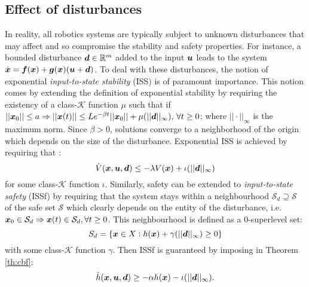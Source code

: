 \subsection{Effect of disturbances}
In reality, all robotics systems are typically subject to unknown disturbances that may affect and so compromise the stability and safety properties. For instance, a bounded disturbance $\boldsymbol{d}\in\mathbb{R}^m$ added to the input $\boldsymbol{u}$ leads to the system $\dot{\boldsymbol{x}} = \boldsymbol{f}(\boldsymbol{x})+\boldsymbol{g}(\boldsymbol{x})(\boldsymbol{u}+\boldsymbol{d})$. To deal with these disturbances, the notion of exponential \textit{input-to-state stability} (ISS) is of paramount importance. This notion comes by extending the definition of exponential stability by requiring the existency of a class-$\mathcal{K}$ function $\mu$ such that if $||\boldsymbol{x}_0||  \leq a \Rightarrow  ||\boldsymbol{x}(t)||\leq Le^{-\beta t}||\boldsymbol{x}_0||+ \mu(||\boldsymbol{d}||_\infty ),\, \forall t \geq 0$; where $||\cdot||_\infty$  is the maximum norm.
Since $\beta>0$, solutions converge to a neighborhood of the origin which depends on the size of the disturbance. Exponential ISS is achieved by requiring that : 
\begin{equation}\label{eq:iss}
\dot{V}(\boldsymbol{x},\boldsymbol{u},\boldsymbol{d}) \leq -\lambda V(\boldsymbol{x})+\iota( ||\boldsymbol{d}||_\infty)
\end{equation} for some class-$\mathcal{K}$ function $\iota$. Similarly, safety can be extended to \textit{input-to-state safety} (ISSf) by requiring that the system stays within a neighbourhood $\mathcal{S}_d \supseteq  \mathcal{S}$ of the safe set $\mathcal{S}$ which clearly depends on the entity of the disturbance, i.e. $\boldsymbol{x}_0 \in \mathcal{S}_d \Rightarrow \boldsymbol{x}(t) \in \mathcal{S}_d, \forall t\geq 0$. This neighbourhood is defined as a 0-superlevel set: 
\begin{equation}
    S_d = \{\boldsymbol{x} \in X: h(\boldsymbol{x}) + \gamma(||\boldsymbol{d}||_\infty)\geq 0\}
\end{equation}
with some class-$\mathcal{K}$ function $\gamma$. Then ISSf is guaranteed by imposing in Theorem \ref{th:cbf}: 
\begin{equation}
    \dot{h}(\boldsymbol{x},\boldsymbol{u},\boldsymbol{d})\geq -\alpha h(\boldsymbol{x}) - \iota(||\boldsymbol{d}||_\infty).
\end{equation}